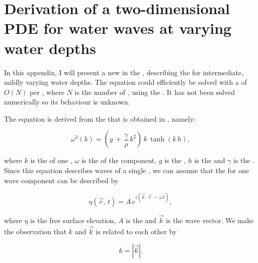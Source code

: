 \chapter{Derivation of a two-dimensional PDE for water waves at varying water depths}
\label{chap:pde_derivation}

In this appendix, I will present a new   \PDE in the , describing the  for intermediate, mildly varying water depths. The equation could efficiently be solved with a  of $O(N)$ per , where $N$ is the number of , using the \CFMM \citep{White1994}. It has not been solved numerically so its behaviour is unknown.

The equation is derived from the  that is obtained in , namely:

\begin{equation} \label{eq:dispersion}
\omega^2(k) = \left(g\,+\,\frac{\gamma}{\rho}\,k^2\right)\,k\,\tanh(k\,h),
\end{equation}

where $k$ is the  of one , $\omega$ is the  of the component, $g$ is the , $h$ is the  and $\gamma$ is the . Since this equation describes waves of a single , we can assume that the  for one wave component can be described by

\begin{equation} \label{eq:component}
\eta(\vec{r},\,t) = A\,e^{i(\vec{k}\cdot\vec{r}\,-\,\omega\,t)},
\end{equation}

where $\eta$ is the free surface elevation, $A$ is the  and $\vec{k}$ is the wave vector. We make the observation that $k$ and $\vec{k}$ is related to each other by

\begin{equation} \label{eq:kvectok}
k = \left|\vec{k}\right|.
\end{equation}

